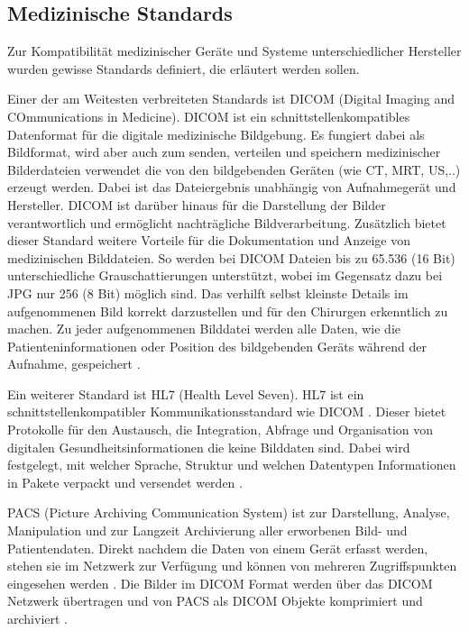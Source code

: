 \subsection{Medizinische Standards}

Zur Kompatibilität medizinischer Geräte und Systeme unterschiedlicher Hersteller wurden gewisse Standards definiert, die erläutert werden sollen.

Einer der am Weitesten verbreiteten Standards ist DICOM (Digital Imaging and COmmunications in Medicine). DICOM ist ein schnittstellenkompatibles Datenformat für die digitale medizinische Bildgebung. Es fungiert dabei als Bildformat, wird aber auch zum senden, verteilen und speichern medizinischer Bilderdateien verwendet die von den bildgebenden Geräten (wie CT, MRT, US,..) erzeugt werden. Dabei ist das Dateiergebnis unabhängig von Aufnahmegerät und Hersteller. DICOM ist darüber hinaus für die Darstellung der Bilder verantwortlich und ermöglicht nachträgliche Bildverarbeitung. Zusätzlich bietet dieser Standard weitere Vorteile für die Dokumentation und Anzeige von medizinischen Bilddateien. So werden bei DICOM Dateien bis zu 65.536 (16 Bit) unterschiedliche Grauschattierungen unterstützt, wobei im Gegensatz dazu bei JPG nur 256 (8 Bit) möglich sind. Das verhilft selbst kleinste Details im aufgenommenen Bild korrekt darzustellen und für den Chirurgen erkenntlich zu machen. Zu jeder aufgenommenen Bilddatei werden alle Daten, wie die Patienteninformationen oder Position des bildgebenden Geräts während der Aufnahme, gespeichert \cite{DICOM}.

Ein weiterer Standard ist HL7 (Health Level Seven). HL7 ist ein schnittstellenkompatibler Kommunikationsstandard wie DICOM \cite{DerDigitaleOperationssaal}. Dieser bietet Protokolle für den Austausch, die Integration, Abfrage und Organisation von digitalen Gesundheitsinformationen die keine Bilddaten sind. Dabei wird festgelegt, mit welcher Sprache, Struktur und welchen Datentypen Informationen in Pakete verpackt und versendet werden \cite{HL7}.

PACS (Picture Archiving Communication System) ist zur Darstellung, Analyse, Manipulation und zur Langzeit Archivierung aller erworbenen Bild- und Patientendaten. Direkt nachdem die Daten von einem Gerät erfasst werden, stehen sie im Netzwerk zur Verfügung und können von mehreren Zugriffspunkten eingesehen werden \cite{PACS}.
Die Bilder im DICOM Format werden über das DICOM Netzwerk übertragen und von PACS als DICOM Objekte komprimiert und archiviert \cite{DICOM}.


